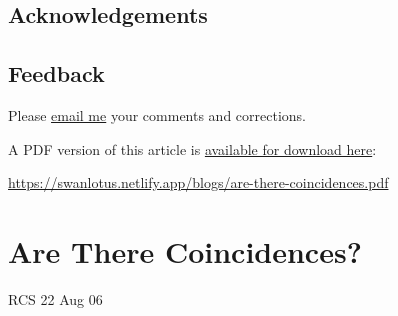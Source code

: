 \documentclass[
  a4paper,
]{article}
\begin{document}
\subsection{Acknowledgements}\label{acknowledgements}

\subsection{Feedback}\label{feedback}

Please \href{mailto:feedback.swanlotus@gmail.com}{email me} your
comments and corrections.

\noindent A PDF version of this article is
\href{./are-there-coincidences.pdf}{available for download here}:

\begin{sffamily}

\url{https://swanlotus.netlify.app/blogs/are-there-coincidences.pdf}

\end{sffamily}

\section{Are There Coincidences?}\label{are-there-coincidences}

RCS 22 Aug 06
\end{document}
